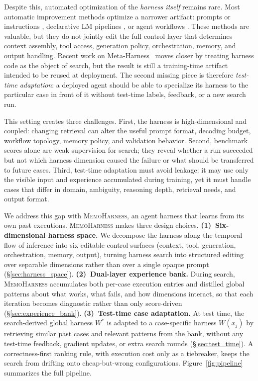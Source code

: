 \documentclass{article}
\newcommand{\method}{\textsc{MemoHarness}\xspace}
\begin{document}
Despite this, automated optimization of the \emph{harness itself}
remains rare. Most automatic improvement methods optimize a narrower
artifact: prompts or instructions
\citep{fernando2023promptbreeder}, declarative LM pipelines
\citep{khattab2023dspy}, or agent workflows
\citep{zhang2024aflow}. These methods are valuable, but they do not
jointly edit the full control layer that determines context assembly,
tool access, generation policy, orchestration, memory, and output
handling. Recent work on Meta-Harness~\citep{lee2026metaharness} moves
closer by treating harness code as the object of search, but the
result is still a training-time artifact intended to be reused at
deployment. The second missing piece is therefore \emph{test-time
adaptation}: a deployed agent should be able to specialize its harness
to the particular case in front of it without test-time labels, feedback,
or a new search run.

This setting creates three challenges. First, the harness is
high-dimensional and coupled: changing retrieval can alter the useful
prompt format, decoding budget, workflow topology, memory policy, and
validation behavior. Second, benchmark scores alone are weak supervision
for search; they reveal whether a run succeeded but not which harness
dimension caused the failure or what should be transferred to future
cases. Third, test-time adaptation must avoid leakage:
it may use only the visible input and experience accumulated during
training, yet it must handle cases that differ in domain, ambiguity,
reasoning depth, retrieval needs, and output format.

We address this gap with \method, an agent harness that learns from its
own past executions. \method makes three design choices.
\textbf{(1)~Six-dimensional harness space.} We decompose the harness
along the temporal flow of inference into six editable control
surfaces (context, tool, generation, orchestration, memory, output),
turning harness search into structured editing over separable
dimensions rather than over a single opaque prompt
(\S\ref{sec:harness_space}).
\textbf{(2)~Dual-layer experience bank.} During search, \method
accumulates both per-case execution entries and distilled global
patterns about what works, what fails, and how dimensions interact, so
that each iteration becomes diagnostic rather than only score-driven
(\S\ref{sec:experience_bank}).
\textbf{(3)~Test-time case adaptation.} At test time, the
search-derived global harness $W^*$ is adapted to a case-specific
harness $W(x_j)$ by retrieving similar past cases and relevant patterns
from the bank, without any test-time feedback, gradient updates, or
extra search rounds (\S\ref{sec:test_time}). A correctness-first ranking
rule, with execution cost only as a tiebreaker, keeps the search from
drifting onto cheap-but-wrong configurations.
Figure~\ref{fig:pipeline} summarizes the full pipeline.
\end{document}
